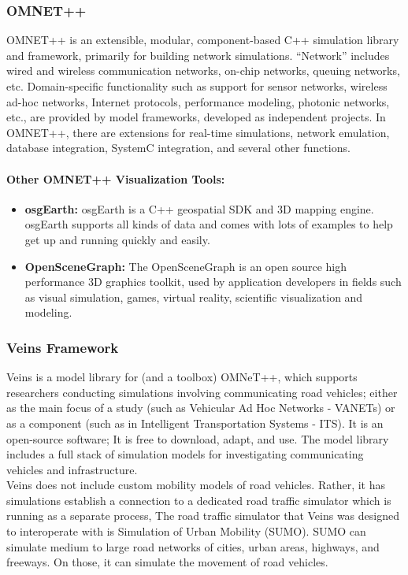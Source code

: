 				\subsubsection{OMNET++}
				OMNET++ \cite{omnet_sim} is an extensible, modular, component-based C++ simulation library and framework, primarily for building network simulations. “Network” includes wired and wireless communication networks, on-chip networks, queuing networks, etc. Domain-specific functionality such as support for sensor networks, wireless ad-hoc networks, Internet protocols, performance modeling, photonic networks, etc., are provided by model frameworks, developed as independent projects. In OMNET++, there are extensions for real-time simulations, network emulation, database integration, SystemC integration, and several other functions. 
				
				\paragraph{Other OMNET++ Visualization Tools:}
				\begin{itemize}
					\let\labelitemi\labelitemii
					\item \textbf{osgEarth:} osgEarth \cite{osgearth} is a C++ geospatial SDK and 3D mapping engine. osgEarth supports all kinds of data and comes with lots of examples to help get up and running quickly and easily. 
					\item \textbf{OpenSceneGraph:} The OpenSceneGraph \cite{openscenegraph} is an open source high performance 3D graphics toolkit, used by application developers in fields such as visual simulation, games, virtual reality, scientific visualization and modeling. 
				\end{itemize}
				
				\subsubsection{Veins Framework}
				Veins \cite{sommer2019veins} is a model library for (and a toolbox) OMNeT++, which supports researchers conducting simulations involving communicating road vehicles; either as the main focus of a study (such as Vehicular Ad Hoc Networks - VANETs) or as a component (such as in Intelligent Transportation Systems - ITS). It is an open-source software; It is free to download, adapt, and use. The model library includes a full stack of simulation models for investigating communicating vehicles and infrastructure. \\
				Veins does not include custom mobility models of road vehicles. Rather, it has simulations establish a connection to a dedicated road traffic simulator which is running as a separate process, The road traffic simulator that Veins was designed to interoperate with is Simulation of Urban Mobility (SUMO). SUMO can simulate medium to large road networks of cities, urban areas, highways, and freeways. On those, it can simulate the movement of road vehicles. 
				
